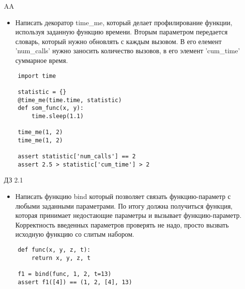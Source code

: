 \documentclass{article}
\begin{document}
\begin{center} AA \end{center}
\begin{itemize}
    \item Написать декоратор time\_me, который делает профилирование функции, 
        используя заданную функцию времени. Вторым параметром передается словарь,
        который нужно обновлять с каждым вызовом. В его елемент 'num\_calls' нужно
        заносить количество вызовов, в его элемент 'cum\_time' суммарное время.
\end{itemize}
\vspace{15pt}
\begin{lstlisting}
    import time

    statistic = {}
    @time_me(time.time, statistic)
    def som_func(x, y):
        time.sleep(1.1)

    time_me(1, 2)
    time_me(1, 2)

    assert statistic['num_calls'] == 2
    assert 2.5 > statistic['cum_time'] > 2
\end{lstlisting}
\newpage

\begin{center} ДЗ 2.1 \end{center}
\begin{itemize}
    \item Написать функцию bind который позволяет связать функцию-параметр с любыми заданными 
        параметрами. По итогу должна получиться функция, которая принимает недостающие параметры
        и вызывает функцию-параметр. Корректность введенных параметров проверять не надо, просто 
        вызвать исходную функцию со слитым набором.
\end{itemize}
\vspace{15pt}
\begin{lstlisting}
    def func(x, y, z, t):
        return x, y, z, t

    f1 = bind(func, 1, 2, t=13)
    assert f1([4]) == (1, 2, [4], 13)
\end{lstlisting}
\newpage
\end{document}
